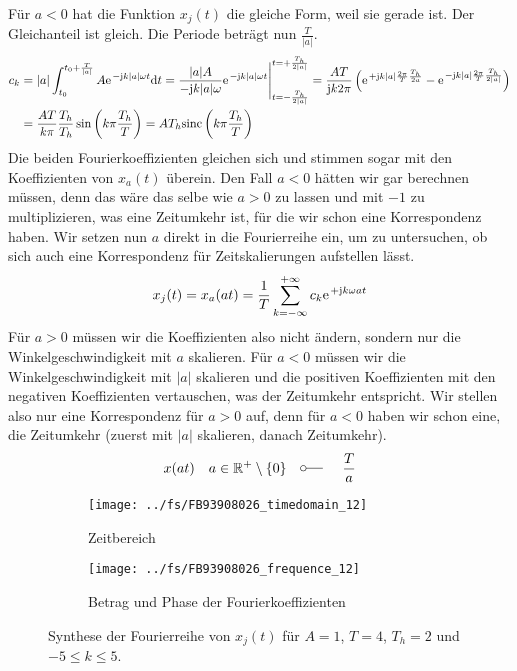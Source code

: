 \documentclass[11pt,a4paper,DIV=12]{scrartcl}
\newcommand{\diff}{\mathrm{d}}
\newcommand{\sinc}{\mathrm{sinc}}
\begin{document}
%
%
Für $a<0$ hat die Funktion $x_{j}(t)$ die gleiche Form, weil sie gerade ist.
%
Der Gleichanteil ist gleich.
%
Die Periode beträgt nun $\frac{T}{|a|}$.
%
%
\begin{align}
	c_k&=|a|\int_{t_0}^{t_0+\frac{T}{|a|}}A\e^{-\im k |a|\omega t}\diff t
	=\frac{|a|A}{-\im k |a| \omega }\e^{-\im k |a| \omega t}\Bigg |_{t=-\frac{T_h}{2|a|}}^{t=+\frac{T_h}{2|a|}}
	=\frac{AT}{\im k 2\pi}\left (\e^{+\im k |a|\frac{2\pi}{T}\frac{T_h}{2a}}-\e^{-\im k |a|\frac{2\pi}{T}\frac{T_h}{2|a|}}\right )\nonumber\\
	&=\frac{AT}{k\pi}\frac{T_h}{T_h}\sin\left(k\pi\frac{T_h}{T}\right)=AT_h\sinc\left(k\pi\frac{T_h}{T}\right)
\end{align}
%
%
Die beiden Fourierkoeffizienten gleichen sich und stimmen sogar mit den
Koeffizienten von $x_{a}(t)$ überein.
%
Den Fall $a<0$ hätten wir gar berechnen müssen, denn das wäre das selbe wie
$a>0$ zu lassen und mit $-1$ zu multiplizieren, was eine Zeitumkehr ist,
für die wir schon eine Korrespondenz haben.
%
Wir setzen nun $a$ direkt in die Fourierreihe ein, um zu untersuchen,
ob sich auch eine Korrespondenz für Zeitskalierungen aufstellen lässt.
%
\begin{align}
	x_{j}(t)=x_{a}(at)=\frac{1}{T}\sum_{k=-\infty}^{+\infty}c_k\e^{+\im k \omega at}
\end{align}
%
Für $a>0$ müssen wir die Koeffizienten also nicht ändern, sondern nur die
Winkelgeschwindigkeit mit $a$ skalieren.
%
Für $a<0$ müssen wir die Winkelgeschwindigkeit mit $|a|$ skalieren und die
positiven Koeffizienten mit den negativen Koeffizienten vertauschen, was der
Zeitumkehr entspricht.
%
Wir stellen also nur eine Korrespondenz für $a>0$ auf, denn für $a<0$ haben wir
schon eine, die Zeitumkehr (zuerst mit $|a|$ skalieren, danach Zeitumkehr).
%
%
\begin{align}
	x(at)\quad a\in\mathbb{R}^+\setminus\{0\}\quad\fourier\quad \frac{T}{a}
\end{align}
%
%
\begin{figure}
	\centering
	\begin{subfigure}{\textwidth}
		\texttt{[image: ../fs/FB93908026\_timedomain\_12]}
		\caption{Zeitbereich}
	\end{subfigure}
	\begin{subfigure}{\textwidth}
		\texttt{[image: ../fs/FB93908026\_frequence\_12]}
		\caption{Betrag und Phase der Fourierkoeffizienten}
	\end{subfigure}
	\caption{Synthese der Fourierreihe von $x_j(t)$ für $A=1$, $T=4$, $T_h=2$ und
		$-5\leq k\leq5$.}
\end{figure}
%
\newpage
\end{document}

